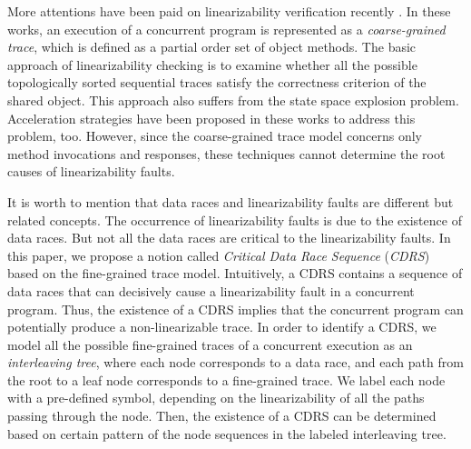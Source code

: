 \documentclass[runningheads]{llncs}
\begin{document}
More attentions have been paid on linearizability verification recently \cite{DBLP:conf/pldi/BurckhardtDMT10,DBLP:conf/popl/BouajjaniEEH15,DBLP:conf/forte/HornK15a,DBLP:conf/sac/LongZ16,DBLP:journals/concurrency/Lowe17}.     
In these works, an execution of a concurrent program is represented as a \textit{coarse-grained trace}, which is defined as a partial order set of object methods. 
The basic approach of linearizability checking is to examine whether all the possible topologically sorted sequential traces satisfy the correctness criterion of the shared object. This approach also suffers from the state space explosion problem. Acceleration strategies have been proposed in these works to address this problem, too.  
However, since the coarse-grained trace model concerns only method invocations and responses, 
these techniques cannot determine the root causes of linearizability faults.

It is worth to mention that data races and linearizability faults are different but related concepts. 
The occurrence of linearizability faults is due to the existence of data races. But not all the data races are critical to the linearizability faults. 
In this paper, we propose a notion called \textit{Critical Data Race Sequence} (\textit{CDRS}) based on the fine-grained trace model. 
Intuitively, a CDRS contains a sequence of data races that can decisively cause a linearizability fault in a concurrent program. 
Thus, the existence of a CDRS implies that the concurrent program can potentially produce a non-linearizable trace. 
In order to identify a CDRS, we model all the possible fine-grained traces of a concurrent execution as an \textit{interleaving tree}, 
where each node corresponds to a data race, and each path from the root to a leaf node corresponds to a fine-grained trace. 
We label each node with a pre-defined symbol, depending on the linearizability of all the paths passing through the node. 
Then, the existence of a CDRS can be determined based on certain pattern of the node sequences in the labeled interleaving tree.
 
\end{document}
